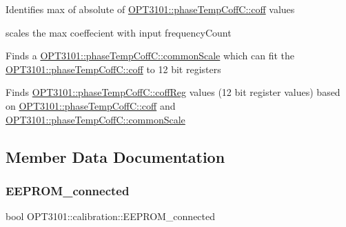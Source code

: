 \begin{DoxyItemize}
\item Identifies max of absolute of \mbox{\hyperlink{class_o_p_t3101_1_1phase_temp_coff_c_ade7d29c7cac1e63af7910eec0ec38043}{O\+P\+T3101\+::phase\+Temp\+Coff\+C\+::coff}} values ~\newline
~\newline
~\newline

\item scales the max coeffecient with input frequency\+Count ~\newline
~\newline

\item Finds a \mbox{\hyperlink{class_o_p_t3101_1_1phase_temp_coff_c_a0f7646d71d058bc5354ac8f14270fcf3}{O\+P\+T3101\+::phase\+Temp\+Coff\+C\+::common\+Scale}} which can fit the \mbox{\hyperlink{class_o_p_t3101_1_1phase_temp_coff_c_ade7d29c7cac1e63af7910eec0ec38043}{O\+P\+T3101\+::phase\+Temp\+Coff\+C\+::coff}} to 12 bit registers
\item Finds \mbox{\hyperlink{class_o_p_t3101_1_1phase_temp_coff_c_a69e1782e097ce7ab761e4e55b5206f2e}{O\+P\+T3101\+::phase\+Temp\+Coff\+C\+::coff\+Reg}} values (12 bit register values) based on \mbox{\hyperlink{class_o_p_t3101_1_1phase_temp_coff_c_ade7d29c7cac1e63af7910eec0ec38043}{O\+P\+T3101\+::phase\+Temp\+Coff\+C\+::coff}} and \mbox{\hyperlink{class_o_p_t3101_1_1phase_temp_coff_c_a0f7646d71d058bc5354ac8f14270fcf3}{O\+P\+T3101\+::phase\+Temp\+Coff\+C\+::common\+Scale}} 
\end{DoxyItemize}

\subsection{Member Data Documentation}
\mbox{\label{class_o_p_t3101_1_1calibration_a5a8e3d0fc96ea3319d10585cb073da35}} 
\subsubsection{\texorpdfstring{E\+E\+P\+R\+O\+M\+\_\+connected}{EEPROM\_connected}}
{\footnotesize\ttfamily bool O\+P\+T3101\+::calibration\+::\+E\+E\+P\+R\+O\+M\+\_\+connected}



